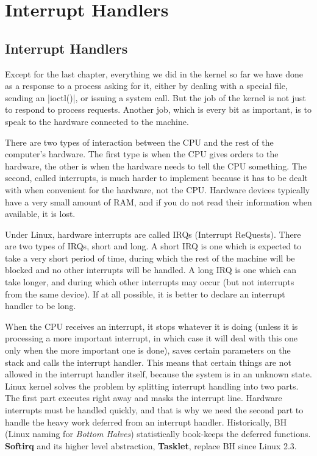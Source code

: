 \documentclass[10pt, oneside]{book}
\begin{document}

\section{Interrupt Handlers}
\label{sec:interrupt_handler}
\subsection{Interrupt Handlers}
\label{sec:irq}
Except for the last chapter, everything we did in the kernel so far we have done as a response to a process asking for it, either by dealing with a special file, sending an \cpp|ioctl()|, or issuing a system call.
But the job of the kernel is not just to respond to process requests.
Another job, which is every bit as important, is to speak to the hardware connected to the machine.

There are two types of interaction between the CPU and the rest of the computer's hardware.
The first type is when the CPU gives orders to the hardware, the other is when the hardware needs to tell the CPU something.
The second, called interrupts, is much harder to implement because it has to be dealt with when convenient for the hardware, not the CPU.
Hardware devices typically have a very small amount of RAM, and if you do not read their information when available, it is lost.

Under Linux, hardware interrupts are called IRQs (Interrupt ReQuests).
There are two types of IRQs, short and long.
A short IRQ is one which is expected to take a very short period of time, during which the rest of the machine will be blocked and no other interrupts will be handled.
A long IRQ is one which can take longer, and during which other interrupts may occur (but not interrupts from the same device).
If at all possible, it is better to declare an interrupt handler to be long.

When the CPU receives an interrupt, it stops whatever it is doing (unless it is processing a more important interrupt, in which case it will deal with this one only when the more important one is done),
saves certain parameters on the stack and calls the interrupt handler.
This means that certain things are not allowed in the interrupt handler itself, because the system is in an unknown state.
Linux kernel solves the problem by splitting interrupt handling into two parts.
The first part executes right away and masks the interrupt line.
Hardware interrupts must be handled quickly, and that is why we need the second part to handle the heavy work deferred from an interrupt handler.
Historically, BH (Linux naming for \textit{Bottom Halves}) statistically book-keeps the deferred functions.
\textbf{Softirq} and its higher level abstraction, \textbf{Tasklet}, replace BH since Linux 2.3.
\end{document}
